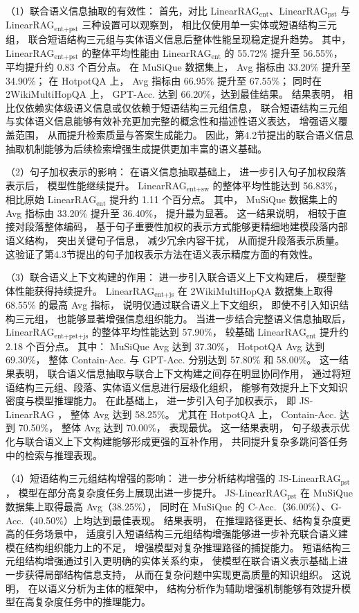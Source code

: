 （1）联合语义信息抽取的有效性：
首先，对比 LinearRAG$_{\text{ent}}$、LinearRAG$_{\text{pst}}$ 与 LinearRAG$_{\text{ent+pst}}$ 三种设置可以观察到，
相比仅使用单一实体或短语结构三元组，
联合短语结构三元组与实体语义信息后整体性能呈现稳定提升趋势。
其中，LinearRAG$_{\text{ent+pst}}$ 的整体平均性能由
LinearRAG$_{\text{ent}}$ 的 55.72\%
提升至 56.55\%，
平均提升约 0.83 个百分点。
在 MuSiQue 数据集上，
Avg 指标由 33.20\% 提升至 34.90\%；
在 HotpotQA 上，
Avg 指标由 66.95\% 提升至 67.55\%；
同时在 2WikiMultiHopQA 上，
GPT-Acc. 达到 66.20\%，达到最佳结果。
结果表明，
相比仅依赖实体级语义信息或仅依赖于短语结构三元组信息，
联合短语结构三元组与实体语义信息能够有效补充更加完整的概念性和描述性语义表达，
增强语义覆盖范围，
从而提升检索质量与答案生成能力。
因此，第4.2节提出的联合语义信息抽取机制能够为后续检索增强生成提供更加丰富的语义基础。

（2）句子加权表示的影响：
在语义信息抽取基础上，
进一步引入句子加权段落表示后，
模型性能继续提升。
LinearRAG$_{\text{ent+sw}}$ 的整体平均性能达到 56.83\%，
相比原始 LinearRAG$_{\text{ent}}$ 提升约 1.11 个百分点。
其中，
MuSiQue 数据集上的 Avg 指标由 33.20\% 提升至 36.40\%，
提升最为显著。
这一结果说明，
相较于直接对段落整体编码，
基于句子重要性加权的表示方式能够更精细地建模段落内部语义结构，
突出关键句子信息，
减少冗余内容干扰，
从而提升段落表示质量。
这验证了第4.3节提出的句子加权表示方法在语义表示精度方面的有效性。

（3）联合语义上下文构建的作用：
进一步引入联合语义上下文构建后，
模型整体性能获得持续提升。
LinearRAG$_{\text{ent+js}}$ 在 2WikiMultiHopQA 数据集上取得 68.55\% 的最高 Avg 指标，
说明仅通过联合语义上下文组织，
即使不引入知识结构三元组，
也能够显著增强信息组织能力。
当进一步结合完整语义信息抽取后，
LinearRAG$_{\text{ent+pst+js}}$ 的整体平均性能达到 57.90\%，
较基础 LinearRAG$_{\text{ent}}$ 提升约 2.18 个百分点。
其中：
MuSiQue Avg 达到 37.30\%，
HotpotQA Avg 达到 69.30\%，
整体 Contain-Acc. 与 GPT-Acc. 分别达到 57.80\% 和 58.00\%。
这一结果表明，
联合语义信息抽取与联合上下文构建之间存在明显协同作用，
通过将短语结构三元组、段落、实体语义信息进行层级化组织，
能够有效提升上下文知识密度与模型推理能力。
在此基础上，
进一步引入句子加权表示，
即 JS-LinearRAG ，
整体 Avg 达到 58.25\%。
尤其在 HotpotQA 上，
Contain-Acc. 达到 70.50\%，
整体 Avg 达到 70.00\%，
表现最优。
这一结果表明，
句子级表示优化与联合语义上下文构建能够形成更强的互补作用，
共同提升复杂多跳问答任务中的检索与推理表现。

（4）短语结构三元组结构增强的影响：
进一步分析结构增强的 JS-LinearRAG$_{\text{pst}}$，
模型在部分高复杂度任务上展现出进一步提升。
JS-LinearRAG$_{\text{pst}}$ 在 MuSiQue 数据集上取得最高 Avg（38.25\%），
同时在 MuSiQue 的 C-Acc.（36.00\%）、G-Acc.（40.50\%）上均达到最佳表现。
结果表明，
在推理路径更长、结构复杂度更高的任务场景中，
适度引入短语结构三元组结构增强能够进一步补充联合语义建模在结构组织能力上的不足，
增强模型对复杂推理路径的捕捉能力。
短语结构三元组结构增强通过引入更明确的实体关系约束，
使模型在联合语义表示基础上进一步获得局部结构信息支持，
从而在复杂问题中实现更高质量的知识组织。
这说明，
在以语义分析为主体的框架中，
结构分析作为辅助增强机制能够有效提升模型在高复杂度任务中的推理能力。

